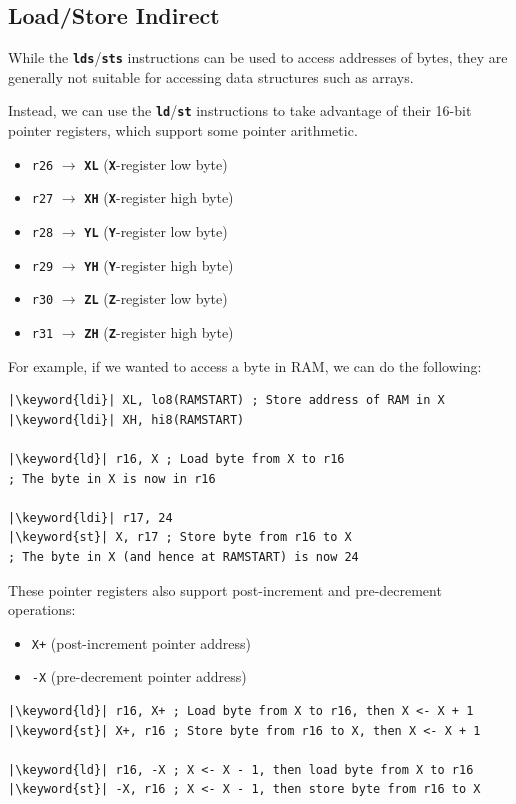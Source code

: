 \documentclass{report}
\newcommand{\keyword}[1]{\textcolor[rgb]{0.00,0.50,0.00}{\textbf{#1}}}
\newcommand{\keywordinline}[1]{\textcolor[rgb]{0.00,0.50,0.00}{\textbf{\texttt{#1}}}}
\begin{document}
\subsection{Load/Store Indirect}
While the \keywordinline{lds}/\keywordinline{sts} instructions can be used to access addresses
of bytes, they are generally not suitable for accessing data structures such as arrays.

Instead, we can use the \keywordinline{ld}/\keywordinline{st} instructions to
take advantage of their 16-bit pointer registers, which support some pointer arithmetic.
\begin{itemize}
    \item \texttt{r26} \(\to\) \keywordinline{XL} (\keywordinline{X}-register low byte)
    \item \texttt{r27} \(\to\) \keywordinline{XH} (\keywordinline{X}-register high byte)
    \item \texttt{r28} \(\to\) \keywordinline{YL} (\keywordinline{Y}-register low byte)
    \item \texttt{r29} \(\to\) \keywordinline{YH} (\keywordinline{Y}-register high byte)
    \item \texttt{r30} \(\to\) \keywordinline{ZL} (\keywordinline{Z}-register low byte)
    \item \texttt{r31} \(\to\) \keywordinline{ZH} (\keywordinline{Z}-register high byte)
\end{itemize}
For example, if we wanted to access a byte in RAM, we can do the following:
\begin{verbatim}
|\keyword{ldi}| XL, lo8(RAMSTART) ; Store address of RAM in X
|\keyword{ldi}| XH, hi8(RAMSTART)

|\keyword{ld}| r16, X ; Load byte from X to r16
; The byte in X is now in r16

|\keyword{ldi}| r17, 24
|\keyword{st}| X, r17 ; Store byte from r16 to X
; The byte in X (and hence at RAMSTART) is now 24
\end{verbatim}
These pointer registers also support post-increment and pre-decrement operations:
\begin{itemize}
    \item \texttt{X+} (post-increment pointer address)
    \item \texttt{-X} (pre-decrement pointer address)
\end{itemize}
\begin{verbatim}
|\keyword{ld}| r16, X+ ; Load byte from X to r16, then X <- X + 1
|\keyword{st}| X+, r16 ; Store byte from r16 to X, then X <- X + 1

|\keyword{ld}| r16, -X ; X <- X - 1, then load byte from X to r16
|\keyword{st}| -X, r16 ; X <- X - 1, then store byte from r16 to X
\end{verbatim}
\end{document}
